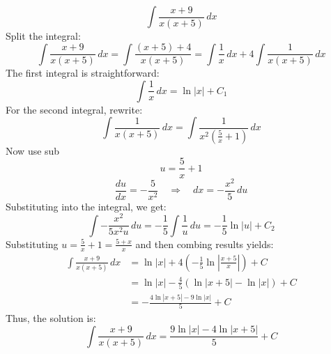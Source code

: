 \documentclass[a4paper, 12pt]{report}
\begin{document}
    \[\int \frac{x + 9}{x(x + 5)} \, dx\]
    Split the integral:
    \[\int \frac{x + 9}{x(x + 5)} \, dx = \int \frac{\left(x + 5\right) + 4}{x(x + 5)} = \int \frac{1}{x} \, dx + 4 \int \frac{1}{x(x + 5)} \, dx\]
    The first integral is straightforward:
    \[\int \frac{1}{x} \, dx = \ln|x| + C_1\]
    For the second integral, rewrite:
    \[\int \frac{1}{x(x + 5)} \, dx = \int \frac{1}{x^2 \left( \frac{5}{x} + 1 \right)} \, dx\]
    Now use sub
    \[u = \frac{5}{x} + 1\]
    \[\frac{du}{dx} = -\frac{5}{x^2} \quad \Rightarrow \quad dx = -\frac{x^2}{5} \, du\]
    Substituting into the integral, we get:
    \[\int -\frac{x^2}{5x^2u} \, du = -\frac{1}{5} \int \frac{1}{u} \, du = -\frac{1}{5} \ln|u| + C_2\]
    Substituting \( u = \frac{5}{x} + 1 = \frac{5+x}{x} \) and then combing results yields:
\begin{align*}
    \int \frac{x + 9}{x(x + 5)} \, dx &= \ln|x| + 4 \left( -\frac{1}{5} \ln\left|\frac{x+5}{x}\right|\right)+C\\
    &=\ln|x| -\frac{4}{5} \left( \ln|x + 5| - \ln|x| \right) + C\\ 
    &= -\frac{4 \ln\left|x + 5\right| - 9 \ln\left|x\right|}{5} + C    
\end{align*}
    Thus, the solution is:
    \[\boxed{\int \frac{x + 9}{x(x + 5)} \, dx =  \frac{9 \ln\left|x\right|-4 \ln\left|x + 5\right|}{5} + C}\]
    
    \newpage
    
\end{document}
